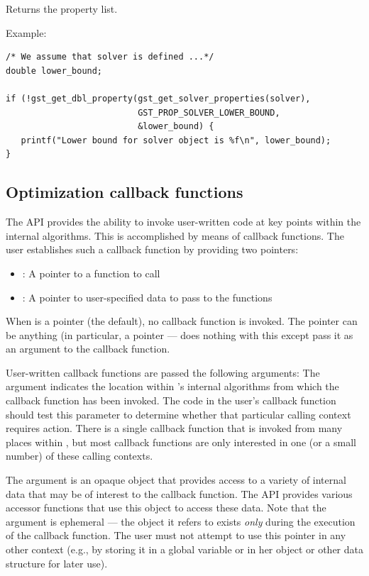 Returns the property list.

\bigskip{}Example:
{\footnotesize
\begin{verbatim}
/* We assume that solver is defined ...*/
double lower_bound;

if (!gst_get_dbl_property(gst_get_solver_properties(solver), 
                          GST_PROP_SOLVER_LOWER_BOUND,
                          &lower_bound) {
   printf("Lower bound for solver object is %f\n", lower_bound);
}
\end{verbatim}
}
\clearpage\subsection{Optimization callback functions}
\label{callbacks}
The \geosteiner{} API provides the ability to invoke user-written code
at key points within the internal \geosteiner{} algorithms.
This is accomplished by means of callback functions.
The user establishes such a callback function by providing two pointers:
\begin{itemize}
 \item {}: A pointer to a function to call
 \item {}: A pointer to user-specified data to pass to the
	 functions
\end{itemize}
When  is a  pointer (the default), no callback
function is invoked.
The  pointer can be anything (in particular, a 
pointer --- \geosteiner{} does nothing with this except pass it as an
argument to the callback function.

User-written callback functions are passed the following arguments:
The  argument indicates the location within
\geosteiner{}'s internal algorithms from which the callback
function has been invoked.
The code in the user's callback function should test this
parameter to determine whether that particular calling context
requires action.
There is a single callback function that is invoked from many
places within \geosteiner{}, but most callback functions are
only interested in one (or a small number) of these calling
contexts.

The  argument is an opaque object that provides
access to a variety of internal \geosteiner{} data that may
be of interest to the callback function.
The \geosteiner{} API provides various accessor functions that
use this  object to access these data.
Note that the  argument is ephemeral --- the object
it refers to exists {\em only} during the execution of the
callback function.
The user must not attempt to use this pointer in any other context
(e.g., by storing it in a global variable or in her 
object or other data structure for later use).

